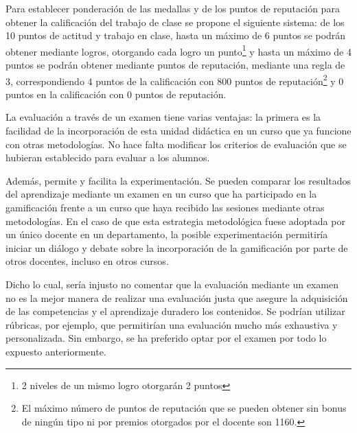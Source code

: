 Para establecer ponderación de las medallas y de los puntos de reputación para obtener la calificación del trabajo de clase se propone el siguiente sistema:
%
de los 10 puntos de actitud y trabajo en clase, hasta un máximo de 6 puntos se podrán obtener mediante logros, otorgando cada logro un punto\footnote{2 niveles de un mismo logro otorgarán 2 puntos} y hasta un máximo de 4 puntos se podrán obtener mediante puntos de reputación, mediante una regla de 3, correspondiendo 4 puntos de la calificación con 800 puntos de reputación\footnote{El máximo número de puntos de reputación que se pueden obtener sin bonus de ningún tipo ni por premios otorgados por el docente son 1160.} y 0 puntos en la calificación con 0 puntos de reputación.


La evaluación a través de un examen tiene varias ventajas:
%
la primera es la facilidad de la incorporación de esta unidad didáctica en un curso que ya funcione con otras metodologías.
%
No hace falta modificar los criterios de evaluación que se hubieran establecido para evaluar a los alumnos.

Además, permite y facilita la experimentación.
%
Se pueden comparar los resultados del aprendizaje mediante un examen en un curso que ha participado en la gamificación frente a un curso que haya recibido las sesiones mediante otras metodologías.
%
En el caso de que esta estrategia metodológica fuese adoptada por un único docente en un departamento, la posible experimentación permitiría iniciar un diálogo y debate sobre la incorporación de la gamificación por parte de otros docentes, incluso en otros cursos.

Dicho lo cual, sería injusto no comentar que la evaluación mediante un examen no es la mejor manera de realizar una evaluación justa que asegure la adquisición de las competencias y el aprendizaje duradero los contenidos.
%
Se podrían utilizar rúbricas, por ejemplo, que permitirían una evaluación mucho más exhaustiva y personalizada.
%
Sin embargo, se ha preferido optar por el examen por todo lo expuesto anteriormente.



